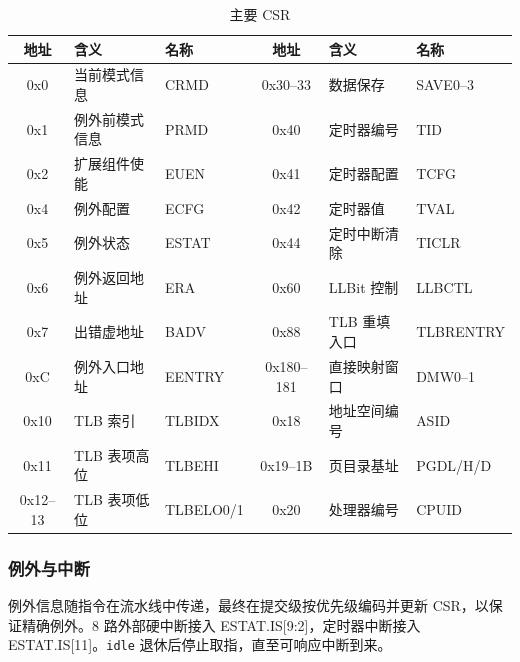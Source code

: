 \begin{table}[H]
\centering
\caption{主要 CSR}
\label{tab:csr}
\scriptsize
\begin{tabularx}{\textwidth}{cXlcXl}
\toprule
地址 & 含义 & 名称 & 地址 & 含义 & 名称 \\
\midrule
0x0 & 当前模式信息 & CRMD & 0x30--33 & 数据保存 & SAVE0--3 \\
0x1 & 例外前模式信息 & PRMD & 0x40 & 定时器编号 & TID \\
0x2 & 扩展组件使能 & EUEN & 0x41 & 定时器配置 & TCFG \\
0x4 & 例外配置 & ECFG & 0x42 & 定时器值 & TVAL \\
0x5 & 例外状态 & ESTAT & 0x44 & 定时中断清除 & TICLR \\
0x6 & 例外返回地址 & ERA & 0x60 & LLBit 控制 & LLBCTL \\
0x7 & 出错虚地址 & BADV & 0x88 & TLB 重填入口 & TLBRENTRY \\
0xC & 例外入口地址 & EENTRY & 0x180--181 & 直接映射窗口 & DMW0--1 \\
0x10 & TLB 索引 & TLBIDX & 0x18 & 地址空间编号 & ASID \\
0x11 & TLB 表项高位 & TLBEHI & 0x19--1B & 页目录基址 & PGDL/H/D \\
0x12--13 & TLB 表项低位 & TLBELO0/1 & 0x20 & 处理器编号 & CPUID \\
\bottomrule
\end{tabularx}
\end{table}

\subsubsection{例外与中断}

例外信息随指令在流水线中传递，最终在提交级按优先级编码并更新 CSR，以保证精确例外。8 路外部硬中断接入 ESTAT.IS[9:2]，定时器中断接入 ESTAT.IS[11]。\texttt{idle} 退休后停止取指，直至可响应中断到来。

